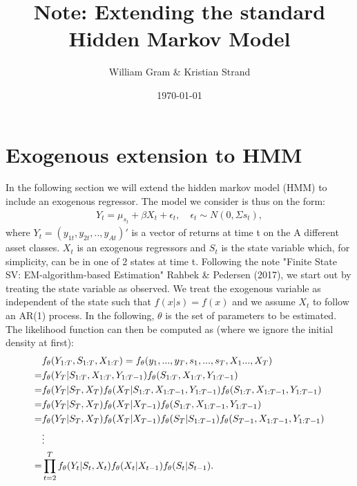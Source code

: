 \documentclass[11pt,a4paper,oneside]{article}
\title{Note: Extending the standard Hidden Markov Model}
\author{William Gram \& Kristian Strand}
\date{\today}
\begin{document}
\maketitle

\newpage

\rfoot{\thepage}

\tableofcontents

\newpage

\setcounter{page}{1}

\section{Exogenous extension to HMM}
\noindent In the following section we will extend the hidden markov model (HMM) to include an exogenous regressor. The model we consider is thus on the form:
\begin{align}
    Y_t=\mu_{s_t}+\beta X_t+\epsilon_t, \quad \epsilon_t \sim N(0,\Sigma{s_t}), 
\end{align}
where $Y_t=(y_{1t},y_{2t},..,y_{At})'$ is a vector of returns at time t on the A different asset classes. $X_t$ is an exogenous regressors and $S_t$ is the state variable which, for simplicity, can be in one of 2 states at time t. Following the note "Finite State SV: EM-algorithm-based Estimation" Rahbek \& Pedersen (2017), we start out by treating the state variable as observed. We treat the exogenous variable as independent of the state such that $f(x\vert s)=f(x)$ and we assume $X_t$ to follow an AR(1) process. In the following, $\theta$ is the set of parameters to be estimated. The likelihood function can then be computed as (where we ignore the initial density at first):
\begin{align}
    &f_\theta(Y_{1:T},S_{1:T},X_{1:T})=f_\theta(y_1,...,y_T,s_1,...,s_T,X_1...,X_T) \notag \\
    =&f_\theta(Y_T\vert S_{1:T},X_{1:T},Y_{1:T-1})f_\theta(S_{1:T},X_{1:T},Y_{1:T-1}) \notag \\
    =&f_\theta(Y_T\vert S_T,X_T)f_\theta(X_T\vert S_{1:T},X_{1:T-1},Y_{1:T-1})f_\theta(S_{1:T},X_{1:T-1},Y_{1:T-1}) \notag \\
    =&f_\theta(Y_T\vert S_T,X_T)f_\theta(X_T\vert X_{T-1})f_\theta(S_{1:T},X_{1:T-1},Y_{1:T-1}) \notag \\
    =&f_\theta(Y_T\vert S_T,X_T)f_\theta(X_T\vert X_{T-1})f_\theta(S_{T}\vert S_{1:T-1})f_\theta(S_{T-1},X_{1:T-1},Y_{1:T-1}) \notag \\\
    &\vdots \notag \\
    =&\prod_{t=2}^{T} f_\theta(Y_t\vert S_t,X_t)f_\theta(X_t\vert X_{t-1})f_\theta(S_t\vert S_{t-1}).
\end{align}
\end{document}
